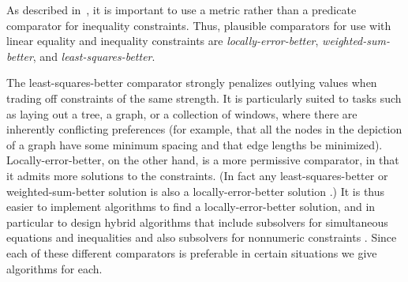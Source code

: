 \documentclass{uist96}
\newcommand{\ignore}[1]{}
\begin{document}
\ignore{
Within this framework a number of variations are possible.  One choice is
whether we only compare solutions on a constraint-by-constraint basis (a
{\em local} comparator), or whether we take some aggregate measure of the
unsatisfied constraints of a given strength (a {\em global} comparator).  A
second choice is whether we are concerned only whether a constraint is
satisfied or not (a {\em predicate} comparator), or whether we also want to
know how nearly satisfied it is (a {\em metric} comparator.  (Constraints
whose domain is a metric space, for example the reals, can have an
associated error function.  The error in satisfying a constraint {\em cn}
is 0 iff the constraint is satisfied, and becomes larger the less nearly
satisfied is the constraint.)
}

As described in~\cite{borning-uist-96},
 it is important to use a metric rather than a
predicate comparator for inequality constraints.  Thus, plausible comparators for use with linear
equality and inequality constraints are {\em locally-error-better}, 
{\em weighted-sum-better}, and {\em least-squares-better}.  
\ignore{For a given
collection of constraints, Cassowary finds a locally-error-better or a
weighted-sum-better solution; QOCA finds a least-squares-better solution.}
The least-squares-better comparator strongly
penalizes outlying values when trading off constraints of the same
strength.  It is particularly suited to tasks such as laying out a tree, a
graph, or a collection of windows, where there are inherently conflicting
preferences (for example, that all the nodes in the depiction of a graph
have some minimum spacing and that edge lengths be minimized).
Locally-error-better, on the other hand, is a more permissive
comparator, in that it admits more solutions to the constraints.  (In fact
any least-squares-better or weighted-sum-better solution is also a
locally-error-better solution \cite{borning-lisp-symbolic-computation-92}.)
It is thus easier to implement algorithms to find a locally-error-better
\linebreak
solution, and in particular to design hybrid algorithms that include
subsolvers for simultaneous equations and inequalities and also subsolvers
for nonnumeric constraints \cite{borning-cp-95}.
Since each of these different comparators is preferable in certain
situations we  give algorithms for each.

\end{document}
